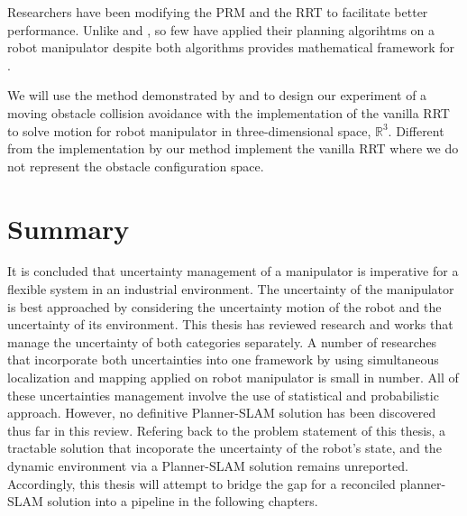 Researchers have been modifying the PRM 
\parencite{Klasing2007,Likhachev2005,Jaillet2004, Pomarlan2013a} 
and the RRT
\parencite{Otte2015,Ferguson2007,Ferguson2006,Bekris2007} to facilitate
better performance. 
Unlike \textcite{Kunz2010a} and \textcite{Wei2018}, so few have applied their planning
algorihtms on a robot manipulator despite both algorithms
provides mathematical framework for .


We will use the method demonstrated by \textcite{Kunz2010a} and
\textcite{Wei2018}
to design our experiment of a moving obstacle collision avoidance with
the implementation of the vanilla RRT to solve motion for robot
manipulator in three-dimensional space, $\mathbb{R}^3$. Different
from the implementation by \textcite{Wei2018} our method
implement the vanilla
RRT where we do not represent the obstacle configuration space.



\section{Summary}

It is  concluded that uncertainty management of a manipulator is imperative for a flexible
system in an industrial environment. The uncertainty of the manipulator is best
approached by considering the uncertainty motion of the robot and the uncertainty of its
environment. This thesis has reviewed research and works that manage the uncertainty of 
both categories separately. A number of researches that incorporate both uncertainties into one framework by
using simultaneous localization and mapping applied on robot manipulator is small in number. 
All of these uncertainties management involve
the use of statistical and probabilistic approach. However, no definitive Planner-SLAM solution 
has been discovered thus far in this review. Refering back to the problem statement of this 
thesis, a tractable solution that incoporate the uncertainty of the robot's state, and the
dynamic environment via a Planner-SLAM solution remains unreported. Accordingly, 
this thesis will attempt
to bridge the gap for a reconciled planner-SLAM solution into a pipeline in the following chapters.


